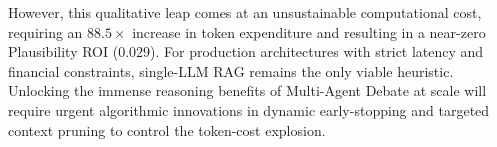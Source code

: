 \documentclass[11pt, conference, onecolumn]{IEEEtran}
\begin{document}
However, this qualitative leap comes at an unsustainable computational cost, requiring an $88.5\times$ increase in token expenditure and resulting in a near-zero Plausibility ROI ($0.029$). For production architectures with strict latency and financial constraints, single-LLM RAG remains the only viable heuristic. Unlocking the immense reasoning benefits of Multi-Agent Debate at scale will require urgent algorithmic innovations in dynamic early-stopping and targeted context pruning to control the token-cost explosion.



\end{document}
